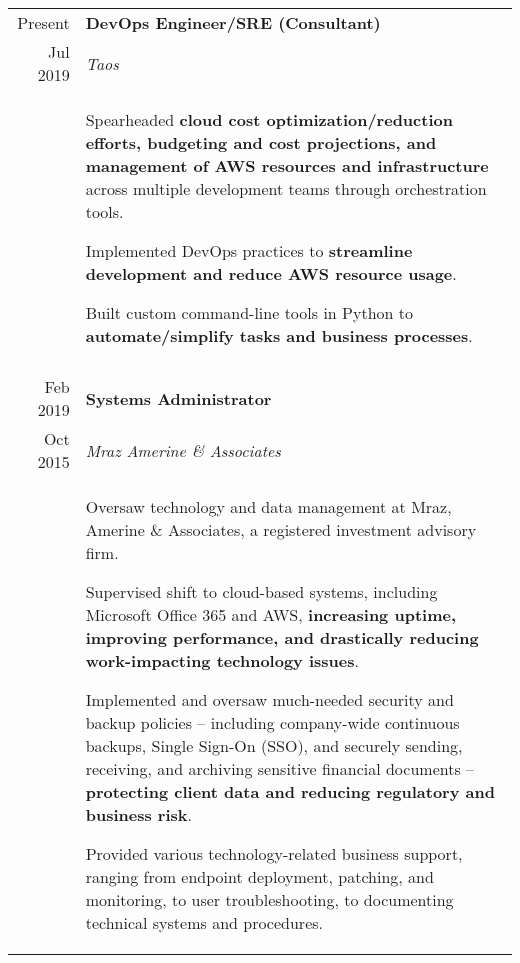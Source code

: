 \documentclass[10pt]{article}
\newcommand{\afterlistspace}[0]{\vspace{-1.5em}}
\begin{document}
\begin{tabular}{r|p{16cm}}
    Present & \textbf{DevOps Engineer/SRE (Consultant)}
    \\
    Jul 2019 & \emph{Taos}
    \\
    & \begin{itemize}
        \footnotesize{
            \item Spearheaded \textbf{cloud cost optimization/reduction efforts, budgeting and cost projections, and management of AWS resources and infrastructure} across multiple development teams through orchestration tools.
            
            \item Implemented DevOps practices to \textbf{streamline development and reduce AWS resource usage}.
            
            \item Built custom command-line tools in Python to \textbf{automate/simplify tasks and business processes}.
            
        }
        \afterlistspace
    \end{itemize}
    
    \\
    \multicolumn{2}{c}{}
    \\

    Feb 2019 & \textbf{Systems Administrator}
    \\
    Oct 2015 & \emph{Mraz Amerine \& Associates}
    \\
    & \begin{itemize}
        \footnotesize{
            \item Oversaw technology and data management at Mraz, Amerine \& Associates, a registered investment advisory firm.
            
            \item Supervised shift to cloud-based systems, including Microsoft Office 365 and AWS, \textbf{increasing uptime, improving performance, and drastically reducing work-impacting technology issues}.
            
            \item Implemented and oversaw much-needed security and backup policies -- including company-wide continuous backups, Single Sign-On (SSO), and securely sending, receiving, and archiving sensitive financial documents -- \textbf{protecting client data and reducing regulatory and business risk}.

            \item Provided various technology-related business support, ranging from endpoint deployment, patching, and monitoring, to user troubleshooting, to documenting technical systems and procedures.
        }
        \afterlistspace
    \end{itemize}
    

\end{tabular}
\end{document}
